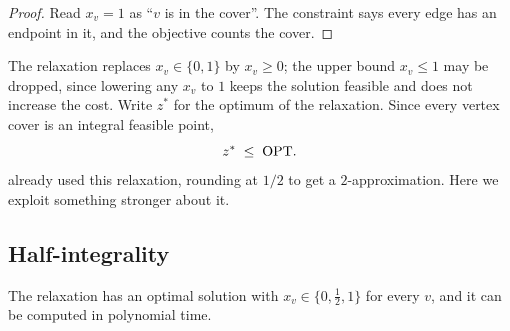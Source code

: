 \begin{proof}
Read $x_v = 1$ as ``$v$ is in the cover''. The constraint says every edge has an
endpoint in it, and the objective counts the cover.
\end{proof}

The relaxation replaces $x_v \in \{0,1\}$ by $x_v \ge 0$; the upper bound
$x_v \le 1$ may be dropped, since lowering any $x_v$ to $1$ keeps the solution
feasible and does not increase the cost. Write $z^{*}$ for the optimum of the
relaxation. Since every vertex cover is an integral feasible point,
\begin{equation}\label{eq:vc-lp-bound}
  z^{*} \;\le\; \mathrm{OPT} .
\end{equation}
 already used this relaxation, rounding at $1/2$ to get a
$2$-approximation. Here we exploit something stronger about it.

\subsection{Half-integrality}

\begin{lemma}\label{lem:half-integral}
The relaxation has an optimal solution with $x_v \in \{0, \tfrac12, 1\}$ for
every $v$, and it can be computed in polynomial time.
\end{lemma}

